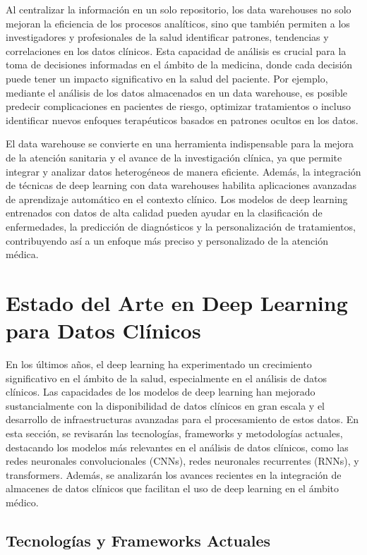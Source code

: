 \documentclass{article}
\begin{document}
Al centralizar la información en un solo repositorio, los data warehouses no solo mejoran la eficiencia de los procesos analíticos, sino que también permiten a los investigadores y profesionales de la salud identificar patrones, tendencias y correlaciones en los datos clínicos. Esta capacidad de análisis es crucial para la toma de decisiones informadas en el ámbito de la medicina, donde cada decisión puede tener un impacto significativo en la salud del paciente. Por ejemplo, mediante el análisis de los datos almacenados en un data warehouse, es posible predecir complicaciones en pacientes de riesgo, optimizar tratamientos o incluso identificar nuevos enfoques terapéuticos basados en patrones ocultos en los datos.

El data warehouse se convierte en una herramienta indispensable para la mejora de la atención sanitaria y el avance de la investigación clínica, ya que permite integrar y analizar datos heterogéneos de manera eficiente. Además, la integración de técnicas de deep learning con data warehouses habilita aplicaciones avanzadas de aprendizaje automático en el contexto clínico. Los modelos de deep learning entrenados con datos de alta calidad pueden ayudar en la clasificación de enfermedades, la predicción de diagnósticos y la personalización de tratamientos, contribuyendo así a un enfoque más preciso y personalizado de la atención médica. \cite{hamoud2018clinical}

\section{Estado del Arte en Deep Learning para Datos Clínicos}
\label{sec:estado_del_arte}

En los últimos años, el deep learning ha experimentado un crecimiento significativo en el ámbito de la salud, especialmente en el análisis de datos clínicos. Las capacidades de los modelos de deep learning han mejorado sustancialmente con la disponibilidad de datos clínicos en gran escala y el desarrollo de infraestructuras avanzadas para el procesamiento de estos datos. En esta sección, se revisarán las tecnologías, frameworks y metodologías actuales, destacando los modelos más relevantes en el análisis de datos clínicos, como las redes neuronales convolucionales (CNNs), redes neuronales recurrentes (RNNs), y transformers. Además, se analizarán los avances recientes en la integración de almacenes de datos clínicos que facilitan el uso de deep learning en el ámbito médico.

\subsection{Tecnologías y Frameworks Actuales}
\end{document}

